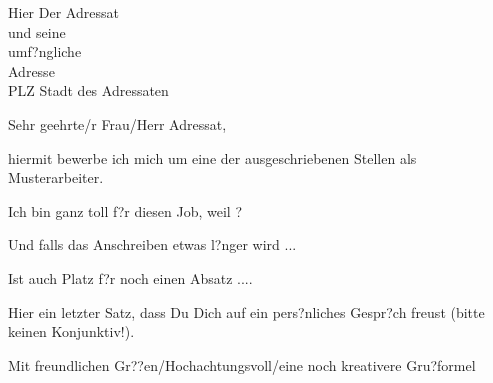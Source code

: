 \documentclass[11pt]{dinbrief}%
\begin{document}
\subject{\textbf{Bewerbung}}
\begin{letter}{Hier Der Adressat\\ und seine\\ umf?ngliche\\Adresse\\[1ex]PLZ Stadt des Adressaten}

\opening{Sehr geehrte/r Frau/Herr Adressat,}
hiermit bewerbe ich mich um eine der ausgeschriebenen Stellen als Musterarbeiter.\par
Ich bin ganz toll f?r diesen Job, weil ? \par
Und falls das Anschreiben etwas l?nger wird ... \par
Ist auch Platz f?r noch einen Absatz .... \par
Hier ein letzter Satz, dass Du Dich auf ein pers?nliches Gespr?ch freust (bitte keinen Konjunktiv!).
\closing{Mit freundlichen Gr??en/Hochachtungsvoll/eine noch kreativere Gru?formel}
\vfill%
\end{letter}
\end{document}
